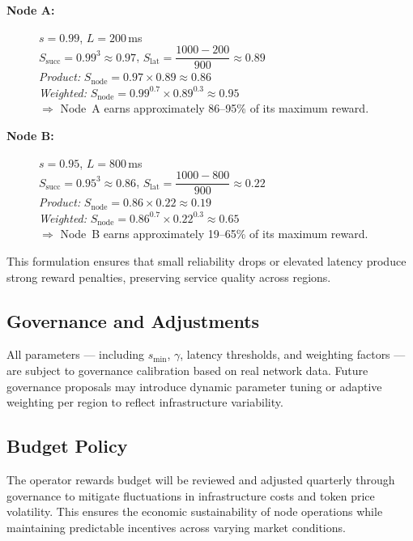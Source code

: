 \documentclass[10pt,twocolumn]{article}
\begin{document}
\begin{description}
    \item[\textbf{Node A:}] $s = 0.99$, $L = 200$\,ms \\
    $S_{\text{succ}} = 0.99^3 \approx 0.97$, \quad
    $S_{\text{lat}} = \dfrac{1000 - 200}{900} \approx 0.89$ \\
    \textit{Product:} $S_{\text{node}} = 0.97 \times 0.89 \approx 0.86$ \\
    \textit{Weighted:} $S_{\text{node}} = 0.99^{0.7} \times 0.89^{0.3} \approx 0.95$ \\
    $\Rightarrow$ Node~A earns approximately 86--95\% of its maximum reward.
    \vspace{0.5em}
    \item[\textbf{Node B:}] $s = 0.95$, $L = 800$\,ms \\
    $S_{\text{succ}} = 0.95^3 \approx 0.86$, \quad
    $S_{\text{lat}} = \dfrac{1000 - 800}{900} \approx 0.22$ \\
    \textit{Product:} $S_{\text{node}} = 0.86 \times 0.22 \approx 0.19$ \\
    \textit{Weighted:} $S_{\text{node}} = 0.86^{0.7} \times 0.22^{0.3} \approx 0.65$ \\
    $\Rightarrow$ Node~B earns approximately 19--65\% of its maximum reward.
\end{description}
This formulation ensures that small reliability drops or elevated latency produce strong reward penalties, preserving service quality across regions.

\subsection{Governance and Adjustments}
All parameters --- including $s_{\min}$, $\gamma$, latency thresholds, and weighting factors --- are subject to governance calibration based on real network data.
Future governance proposals may introduce dynamic parameter tuning or adaptive weighting per region to reflect infrastructure variability.

\subsection{Budget Policy}
The operator rewards budget will be reviewed and adjusted quarterly through governance to mitigate fluctuations in infrastructure costs and token price volatility.
This ensures the economic sustainability of node operations while maintaining predictable incentives across varying market conditions.
\end{document}
